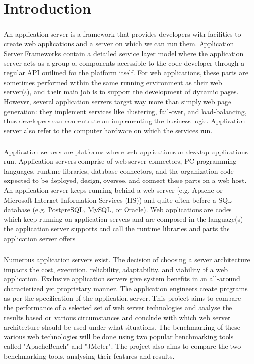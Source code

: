\documentclass[../thesis.tex]{subfiles}
\begin{document}
\chapter{Introduction}

\paragraph{}
An application server is a framework that provides developers with facilities to create web applications and a server on which we can run them. Application Server Frameworks contain a detailed service layer model where the application server acts as a group of components accessible to the code developer through a regular API outlined for the platform itself. For web applications, these parts are sometimes performed within the same running environment as their web server(s), and their main job is to support the development of dynamic pages. However, several application servers target way more than simply web page generation: they implement services like clustering, fail-over, and load-balancing, thus developers can concentrate on implementing the business logic.
Application server also refer to the computer hardware on which the services run.
\paragraph{}
Application servers are platforms where web applications or desktop applications run. Application servers comprise of web server connectors, PC programming languages, runtime libraries, database connectors, and the organization code expected to be deployed, design, oversee, and connect these parts on a web host. An application server keeps running behind a web server (e.g. Apache or Microsoft Internet Information Services (IIS)) and quite often before a SQL database (e.g. PostgreSQL, MySQL, or Oracle). Web applications are codes which keep running on application servers and are composed in the language(s) the application server supports and call the runtime libraries and parts the application server offers.
\paragraph{}
Numerous application servers exist. The decision of choosing a server architecture impacts the cost, execution, reliability, adaptability, and viability of a web application. Exclusive application servers give system benefits in an all-around characterized yet proprietary manner. The application engineers create programs as per the specification of the application server. This project aims to compare the performance of a selected set of web server technologies and analyse the results based on various circumstances and conclude with which web server architecture should be used under what situations. The benchmarking of these various web technologies will be done using two popular benchmarking tools called "ApacheBench" and "JMeter". The project also aims to compare the two benchmarking tools, analysing their features and results.
\end{document}
